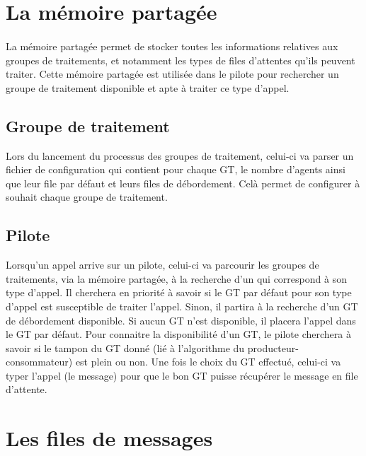 \documentclass{report}
\begin{document}
	\section{La mémoire partagée}
		\paragraph{}
			La mémoire partagée permet de stocker toutes les informations relatives aux groupes de traitements, et notamment les types de files d'attentes qu'ils peuvent traiter. Cette mémoire partagée est utilisée dans le pilote pour rechercher un groupe de traitement disponible et apte à traiter ce type d'appel.

		\subsection{Groupe de traitement}
			Lors du lancement du processus des groupes de traitement, celui-ci va parser un fichier de configuration qui contient pour chaque GT, le nombre d'agents ainsi que leur file par défaut et leurs files de débordement. Celà permet de configurer à souhait chaque groupe de traitement.

		\subsection{Pilote}
			Lorsqu'un appel arrive sur un pilote, celui-ci va parcourir les groupes de traitements, via la mémoire partagée, à la recherche d'un qui correspond à son type d'appel. Il cherchera en priorité à savoir si le GT par défaut pour son type d'appel est susceptible de traiter l'appel. Sinon, il partira à la recherche d'un GT de débordement disponible. Si aucun GT n'est disponible, il placera l'appel dans le GT par défaut. Pour connaitre la disponibilité d'un GT, le pilote cherchera à savoir si le tampon du GT donné (lié à l'algorithme du producteur-consommateur) est plein ou non. Une fois le choix du GT effectué, celui-ci va typer l'appel (le message) pour que le bon GT puisse récupérer le message en file d'attente.

	\section{Les files de messages}
\end{document}
